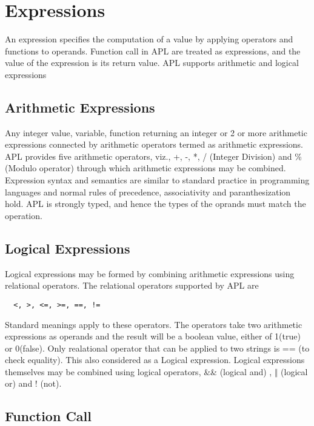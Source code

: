 \documentclass[11pt]{article}
\begin{document}
\section{Expressions}
An expression specifies the computation of a value by applying operators and functions to operands. Function call in APL are treated as expressions, and the value of the expression is its return value. APL supports arithmetic and logical expressions



\subsection{Arithmetic Expressions}

Any integer value, variable, function returning an integer or 2 or more arithmetic expressions connected by arithmetic operators termed as arithmetic expressions. APL provides five arithmetic operators, viz., +, -, *, / (Integer Division) and \% (Modulo operator) through which arithmetic expressions may be combined. Expression syntax and semantics are similar to standard practice in programming languages and normal rules of precedence, associativity and paranthesization hold. APL is strongly typed, and hence the types of the oprands must match the operation. 


\subsection{Logical Expressions}

Logical expressions may be formed by combining arithmetic expressions using relational operators. The relational operators supported by APL are \begin{verbatim}  <, >, <=, >=, ==, !=
\end{verbatim}
Standard  meanings apply to these operators. The operators take two arithmetic expressions as operands and the result will be a boolean value, either of 1(true) or 0(false). Only realational operator that can be applied to two strings is == (to check equality). This also considered as a Logical expression. Logical expressions themselves may be combined using logical operators, \&\& (logical and) ,  $\Vert$ (logical or) and ! (not).

\subsection{Function Call}
\end{document}

